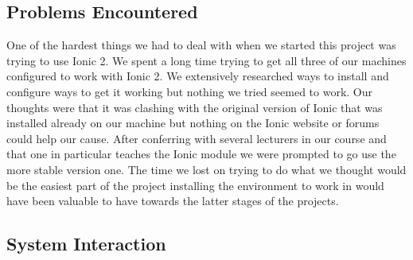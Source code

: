\subsection{Problems Encountered}   
One of the hardest things we had to deal with when we started this project was trying to use Ionic 2. We spent a long time trying to get all three of our machines configured to work with Ionic 2. We extensively researched ways to install and configure ways to get it working but nothing we tried seemed to work. Our thoughts were that it was clashing with the original version of Ionic that was installed already on our machine but nothing on the Ionic website or forums could help our cause. After conferring with several lecturers in our course and that one in particular teaches the Ionic module we were prompted to go use the more stable version one. The time we lost on trying to do what we thought would be the easiest part of the project installing the environment to work in would have been valuable to have towards the latter stages of the projects. 

\subsection{System Interaction}
